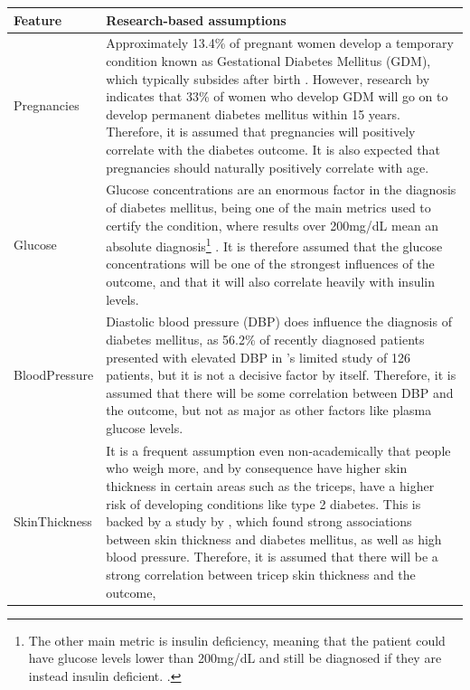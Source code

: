 \documentclass[12pt]{report}
\begin{document}
\begin{longtable}{ | p{} | p{} | }
    \hline
    \cellcolor{blue!25} Feature & \cellcolor{blue!25} Research-based assumptions \\
    \hline
    Pregnancies & Approximately 13.4\% of pregnant women develop a temporary condition known as Gestational 
    Diabetes Mellitus (GDM), which typically subsides after birth \autocite{adam_pregnancy_2023}.
    However, research by \textcite{dennison_absolute_2021} indicates that 33\% of women who develop 
    GDM will go on to develop permanent diabetes mellitus within 15 years. Therefore, it is assumed 
    that pregnancies will positively correlate with the diabetes outcome. It is also expected that 
    pregnancies should naturally positively correlate with age. \\
    \hline
    Glucose & Glucose concentrations are an enormous factor in the diagnosis of diabetes mellitus, being one 
    of the main metrics used to certify the condition, where results over 200mg/dL mean an absolute diagnosis\footnote{The other main metric is insulin deficiency, meaning that the patient could have glucose levels lower than 200mg/dL and still be diagnosed if they are instead insulin deficient. \autocite{aftab_cloud-based_2021}.}
    \autocite{aftab_cloud-based_2021}. It is therefore assumed that the glucose concentrations will be one 
    of the strongest influences of the outcome, and that it will also correlate heavily with insulin levels. \\
    \hline
    BloodPressure & Diastolic blood pressure (DBP) does influence the diagnosis of diabetes mellitus, as 
    56.2\% of recently diagnosed patients presented with elevated DBP in \textcite{nelaj_high_2023}'s limited 
    study of 126 patients, but it is not a decisive factor by itself. Therefore, it is assumed that there will 
    be some correlation between DBP and the outcome, but not as major as other factors like plasma glucose levels.\\
    \hline
    SkinThickness & It is a frequent assumption even non-academically that people who weigh more, and by consequence have higher 
    skin thickness in certain areas such as the triceps, have a higher risk of developing conditions like type 2 diabetes. This is 
    backed by a study by \textcite{ruiz-alejos_skinfold_2020}, which found strong associations between skin thickness and diabetes mellitus,
    as well as high blood pressure. Therefore, it is assumed that there will be a strong correlation between tricep skin thickness and the outcome, 

\end{longtable}
\end{document}
